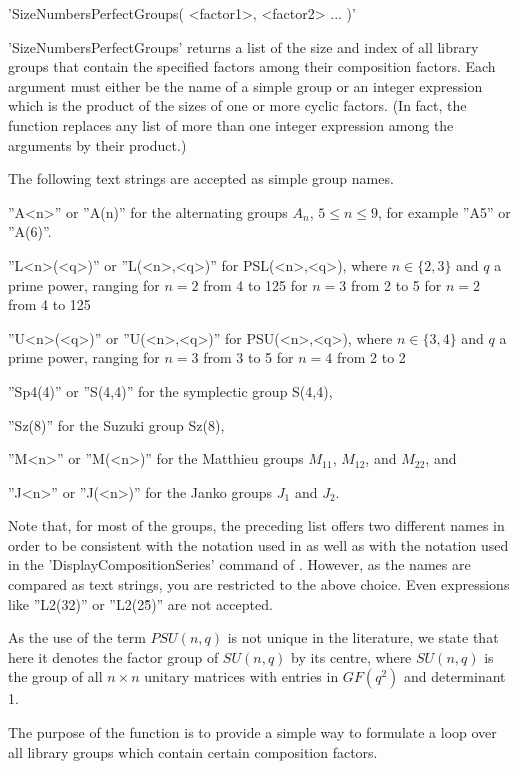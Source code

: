 \>'SizeNumbersPerfectGroups( <factor1>, <factor2> ... )'%

'SizeNumbersPerfectGroups' returns a list of  the size and index  of
all  library groups that contain the specified factors  among
their composition  factors.  Each argument must either  be  the name of a
simple group or  an integer expression which  is the product of the sizes
of one or  more cyclic factors.  (In fact, the function replaces any list
of more than one integer expression among the arguments by their product.)

The following text strings are accepted as simple group names.
{\parindent\manindent
\item{} ''A<n>'' or ''A(n)'' for the alternating groups  $A_n$,
        $5\leq n\leq9$, for example ''A5'' or ''A(6)''.
\item{} ''L<n>(<q>)''  or ''L(<n>,<q>)'' for PSL(<n>,<q>), where
$n\in\{2,3\}$ and $q$ a prime power, ranging
\itemitem for $n=2$ from 4 to 125
\itemitem for $n=3$ from 2 to 5
\itemitem for $n=2$ from 4 to 125
\item{} ''U<n>(<q>)''  or ''U(<n>,<q>)'' for PSU(<n>,<q>), where
$n\in\{3,4\}$ and $q$ a prime power, ranging
\itemitem for $n=3$ from 3 to 5
\itemitem for $n=4$ from 2 to 2
\item{} ''Sp4(4)'' or ''S(4,4)'' for the symplectic group S(4,4),
\item{} ''Sz(8)'' for the Suzuki group Sz(8),
\item{} ''M<n>'' or ''M(<n>)'' for the Matthieu groups 
        $M_{11}$, $M_{12}$, and $M_{22}$, and
\item[] ''J<n>'' or  ''J(<n>)'' for the Janko groups $J_1$
      and $J_2$.
\par}

Note that,    for most of  the  groups,  the preceding   list  offers two
different names in order  to  be consistent  with  the notation  used  in
\cite{HP89}       as  well  as   with    the    notation    used in   the
'DisplayCompositionSeries' command of {\GAP}. However,  as the names  are
compared as text strings,  you are restricted to  the above  choice. Even
expressions like ''L2(32)'' or ''L2(2\^5)'' are not accepted.

As the use of the  term $PSU(n,q)$ is  not  unique in the literature,  we
state that here  it denotes the factor  group of $SU(n,q)$ by its centre,
where $SU(n,q)$ is  the group of all $n  \times n$ unitary matrices  with
entries in $GF(q^2)$ and determinant 1.

The purpose  of the function is  to provide a  simple way to  formulate a
loop over all library groups which contain certain composition factors.

